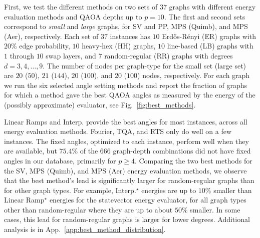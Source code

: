 \documentclass[twocolumn,
english,
aps,
pra,
10pt,
longbibliography,
superscriptaddress,
amsmath,
amssymb,
floatfix
]{revtex4-2}
\begin{document}
{First, we test the different methods on two sets of $37$ graphs with different energy evaluation methods and QAOA depths up to $p=10$.
The first and second sets correspond to \textit{small} and \textit{large} graphs, for SV and PP, MPS (Quimb), and MPS (Aer), respectively.
Each set of $37$ instances has $10$ Erd\H{o}s-R\'enyi (ER) graphs with $20\%$ edge probability, $10$ heavy-hex (HH) graphs, $10$ line-based (LB) graphs with $1$ through $10$ swap layers, and $7$ random-regular (RR) graphs with degrees $d=3,4,\ldots,9$.
The number of nodes per graph-type for the small set (large set) are $20$ ($50$), $21$ ($144$), $20$ ($100$), and $20$ ($100$) nodes, respectively.
For each graph we run the six selected angle setting methods and report the fraction of graphs for which a method gave the best QAOA angles as measured by the energy of the (possibly approximate) evaluator, see Fig.~\ref{fig:best_methods}.

Linear Ramps and Interp. provide the best angles for most instances, across all energy evaluation methods.
Fourier, TQA, and RTS only do well on a few instances.
The fixed angles, optimized to each instance, perform well when they are available, but $75.4\%$ of the $666$ graph-depth combinations did not have fixed angles in our database, primarily for $p\geq{}4$.
Comparing the two best methods for the SV, MPS (Quimb), and MPS (Aer) energy evaluation methods, we observe that the best method's lead is significantly larger for random-regular graphs than for other graph types.
For example, Interp.$^\star$ energies are up to $10\%$ smaller than Linear Ramp$^\star$ energies for the statevector energy evaluator, for all graph types other than random-regular where they are up to about $50\%$ smaller.
In some cases, this lead for random-regular graphs is larger for lower degrees.
Additional analysis is in App.~\ref{app:best_method_distribution}.

}
\end{document}
